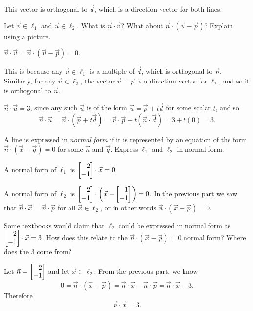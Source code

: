 \documentclass{workbook}
\begin{document}
\begin{slide}
\begin{parts}
\begin{solution}
				This vector is orthogonal to $\vec d$, which is a direction
				vector for both lines.
			\end{solution}
		\item Let $\vec v\in \ell_1$ and $\vec u\in \ell_2$.
			What is $\vec n\cdot \vec v$? What about $\vec n\cdot (\vec u-\vec p)$? Explain using a picture.
			\begin{solution}
				$\vec n\cdot \vec v =\vec n\cdot(\vec u-\vec p)= 0$.

				This is because any $\vec v \in \ell_1$ is a multiple
				of $\vec d$, which is orthogonal to $\vec n$. Similarly, for any $\vec u\in \ell_2$,
				the vector $\vec u-\vec p$ is a direction vector for $\ell_2$, and so it is orthogonal to $\vec n$.

				$\vec n\cdot \vec u=3$, since any such $\vec u$ is of the form
				$\vec u=\vec p+t\vec d$ for some scalar $t$, and so
				\[
					\vec n\cdot \vec u
					=\vec n\cdot (\vec p+t\vec d)
					=\vec n\cdot \vec p+t(\vec n\cdot \vec d)
					=3+t(0)
					=3.
				\]
			\end{solution}
		\item A line is expressed in \emph{normal form} if it is represented by
			an equation of the form $\vec n\cdot (\vec x-\vec q)=0$ for some
			$\vec n$ and $\vec q$. Express $\ell_1$ and $\ell_2$ in normal form.
			\begin{solution}
				A normal form of $\ell_1$ is $\mat{2\\-1}\cdot\vec x=0$.

				A normal form of $\ell_2$ is $\mat{2\\-1}\cdot\left(\vec x-\mat{1\\-1}\right)=0$.
				In the previous part we saw that $\vec n\cdot \vec x=\vec n\cdot \vec p$
				for all $\vec x\in \ell_2$, or in other words $\vec n\cdot (\vec x-\vec p) = 0$.
			\end{solution}
		\item Some textbooks would claim that $\ell_2$ could be expressed in normal form as {\color{cyan}$\mat{2\\-1}\cdot \vec x=3$}.
			How does this relate to the $\vec n\cdot(\vec x-\vec p)=0$ normal form? Where does the $3$ come from?
			\begin{solution}
				Let $\vec n=\mat{2\\-1}$ and let $\vec x\in \ell_2$. From the previous part, we know
				\[
					0=\vec n\cdot (\vec x-\vec p)
					=\vec n\cdot \vec x-\vec n\cdot \vec p
					=\vec n\cdot \vec x-3.
				\]
				Therefore
				\[
					\vec n\cdot \vec x= 3.
				\]
			\end{solution}
	\end{parts}
\end{slide}
\end{document}
